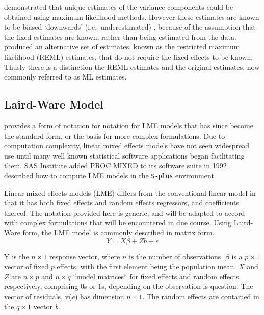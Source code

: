 \documentclass[12pt, a4paper]{report}
\theoremstyle{plain}
\theoremstyle{definition}
\theoremstyle{remark}
\begin{document}
			\citet{HartleyRao} demonstrated that unique estimates of the variance components could be obtained using maximum likelihood methods. However these estimates are known to be biased `downwards' (i.e.\ underestimated) , because of the assumption that the fixed estimates are known, rather than being estimated from the data. \citet{PattersonThompson} produced an alternative set of estimates, known as the restricted maximum likelihood (REML) estimates, that do not require the fixed effects to be known. Thusly there is a distinction the REML estimates and the original estimates, now commonly referred to as ML estimates.
			
	\subsection{Laird-Ware Model} 
	\citet{LW82} provides a form of notation for notation for LME models that has since become the standard form, or the basis for more complex formulations. Due to computation complexity, linear mixed effects models have not seen widespread use until many well known statistical software applications began facilitating them. SAS Institute added PROC MIXED to its software suite in 1992 \citep{singer}. \citet{PB} described how to compute LME models in the \texttt{S-plus} environment.
	
	Linear mixed effects models (LME)
	differs from the conventional linear model in that it has both
	fixed effects and random effects regressors, and coefficients
	thereof. The notation provided here is generic, and will be adapted to accord with complex formulations that will be encountered in due course. Using Laird-Ware form, the LME model is commonly described in matrix form,
	\begin{equation}
	Y = X\beta + Zb + \epsilon
	\label{LW}
	\end{equation}
	
Y is the $n \times 1$ response vector, where  $n$ is the number of observations. \textit{$\beta$} is a $p \times 1$ vector of fixed $p$ effects, with the
	first element being the population mean. $X$ and $Z$ are $n \times p$ and $n \times q$ ``model matrices`` for fixed effects and random effects respectively, comprising
	$0$s or $1$s, depending on the observation is question. The vector of residuals, v(\textit{e}) has
	dimension $n \times 1$. The random effects are contained in the  $q \times
	1$ vector \textit{b}.
			
			
\end{document}
